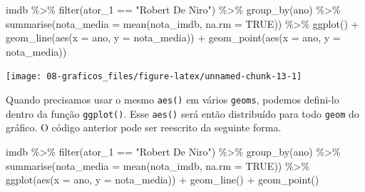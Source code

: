 \documentclass[
]{book}
\newenvironment{Shaded}{\begin{snugshade}}{\end{snugshade}}
\newcommand{\AttributeTok}[1]{\textcolor[rgb]{0.77,0.63,0.00}{#1}}
\newcommand{\ConstantTok}[1]{\textcolor[rgb]{0.00,0.00,0.00}{#1}}
\newcommand{\FunctionTok}[1]{\textcolor[rgb]{0.00,0.00,0.00}{#1}}
\newcommand{\NormalTok}[1]{#1}
\newcommand{\SpecialCharTok}[1]{\textcolor[rgb]{0.00,0.00,0.00}{#1}}
\newcommand{\StringTok}[1]{\textcolor[rgb]{0.31,0.60,0.02}{#1}}
\begin{document}
\begin{Shaded}
\begin{Highlighting}[]
\NormalTok{imdb }\SpecialCharTok{\%\textgreater{}\%} 
  \FunctionTok{filter}\NormalTok{(ator\_1 }\SpecialCharTok{==} \StringTok{"Robert De Niro"}\NormalTok{) }\SpecialCharTok{\%\textgreater{}\%} 
  \FunctionTok{group\_by}\NormalTok{(ano) }\SpecialCharTok{\%\textgreater{}\%} 
  \FunctionTok{summarise}\NormalTok{(}\AttributeTok{nota\_media =} \FunctionTok{mean}\NormalTok{(nota\_imdb, }\AttributeTok{na.rm =} \ConstantTok{TRUE}\NormalTok{)) }\SpecialCharTok{\%\textgreater{}\%} 
  \FunctionTok{ggplot}\NormalTok{() }\SpecialCharTok{+}
  \FunctionTok{geom\_line}\NormalTok{(}\FunctionTok{aes}\NormalTok{(}\AttributeTok{x =}\NormalTok{ ano, }\AttributeTok{y =}\NormalTok{ nota\_media)) }\SpecialCharTok{+}
  \FunctionTok{geom\_point}\NormalTok{(}\FunctionTok{aes}\NormalTok{(}\AttributeTok{x =}\NormalTok{ ano, }\AttributeTok{y =}\NormalTok{ nota\_media))}
\end{Highlighting}
\end{Shaded}

\begin{center}\texttt{[image: 08-graficos\_files/figure-latex/unnamed-chunk-13-1]} \end{center}

Quando precisamos usar o mesmo \texttt{aes()} em vários \texttt{geoms}, podemos defini-lo dentro da função \texttt{ggplot()}. Esse \texttt{aes()} será então distribuído para todo \texttt{geom} do gráfico. O código anterior pode ser reescrito da seguinte forma.

\begin{Shaded}
\begin{Highlighting}[]
\NormalTok{imdb }\SpecialCharTok{\%\textgreater{}\%} 
  \FunctionTok{filter}\NormalTok{(ator\_1 }\SpecialCharTok{==} \StringTok{"Robert De Niro"}\NormalTok{) }\SpecialCharTok{\%\textgreater{}\%} 
  \FunctionTok{group\_by}\NormalTok{(ano) }\SpecialCharTok{\%\textgreater{}\%} 
  \FunctionTok{summarise}\NormalTok{(}\AttributeTok{nota\_media =} \FunctionTok{mean}\NormalTok{(nota\_imdb, }\AttributeTok{na.rm =} \ConstantTok{TRUE}\NormalTok{)) }\SpecialCharTok{\%\textgreater{}\%} 
  \FunctionTok{ggplot}\NormalTok{(}\FunctionTok{aes}\NormalTok{(}\AttributeTok{x =}\NormalTok{ ano, }\AttributeTok{y =}\NormalTok{ nota\_media)) }\SpecialCharTok{+}
  \FunctionTok{geom\_line}\NormalTok{() }\SpecialCharTok{+}
  \FunctionTok{geom\_point}\NormalTok{()}
\end{Highlighting}
\end{Shaded}
\end{document}
